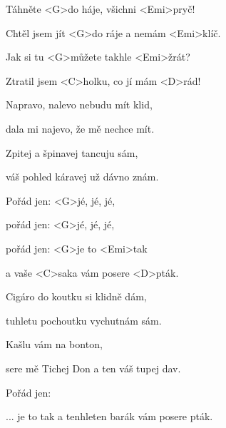 

\zs
Táhněte <G>do háje, všichni <Emi>pryč!

Chtěl jsem jít <G>do ráje a nemám <Emi>klíč.

Jak si tu <G>můžete takhle <Emi>žrát?

Ztratil jsem <C>holku, co jí mám <D>rád!
\ks

\zs
Napravo, {nalevo} nebudu mít {klid,}

dala mi {najevo}, že mě nechce {mít.}

Zpitej a {špinavej} tancuju {sám,}

váš pohled {káravej} už dávno {znám.}
\ks

\zr
Pořád jen:  <G>jé, jé, jé,

pořád jen:  <G>jé, jé, jé,

pořád jen:  <G>je to <Emi>tak

a vaše <C>saka vám posere <D>pták.
\kr

\zs
Cigáro do koutku si klidně dám,

tuhletu pochoutku vychutnám sám.

Kašlu vám na bonton, 

sere mě Tichej Don a ten váš tupej dav.
\ks

\zr \kr

\zr
Pořád jen: 

... je to tak a tenhleten barák vám posere pták.
\kr

\kp





